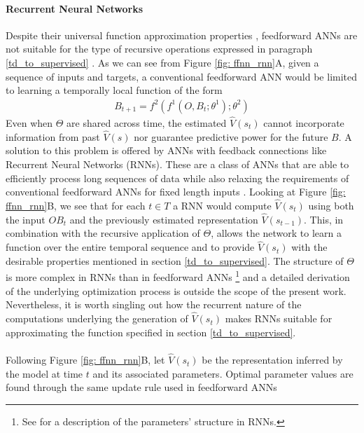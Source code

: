\paragraph*{\textbf{Recurrent Neural Networks}}
\label{rnn_theory}
Despite their universal function approximation properties \cite{hornik1989multilayer}, feedforward ANNs are not suitable for the type of recursive operations expressed in paragraph \ref{td_to_supervised} \cite{bengio2017deep}. As we can see from Figure \ref{fig: ffnn_rnn}A, given a sequence of inputs and targets, a conventional feedforward ANN would be limited to learning a temporally local function of the form
\begin{gather}
\label{td_ffnn}
    B_{t+1} = f^2(f^1(O, B_{t}; \theta^{1}); \theta^{2})
\end{gather}
Even when $\Theta$ are shared across time, the estimated $\widehat{V}(s_t)$ cannot incorporate information from past $\widehat{V}(s)$ nor guarantee predictive power for the future $B$. A solution to this problem is offered by ANNs with feedback connections like Recurrent Neural Networks (RNNs). These  are a class of ANNs that are able to efficiently process long sequences of data while also relaxing the requirements of conventional feedforward ANNs for fixed length inputs \cite{bengio2017deep}. Looking at Figure \ref{fig: ffnn_rnn}B, we see that for each $t \in T$ a RNN would compute $\widehat{V}(s_t)$ using both the input $OB_{t}$ and the previously estimated representation $\widehat{V}(s_{t-1})$. This, in combination with the recursive application of $\Theta$, allows the network to learn a function over the entire temporal sequence and to provide $\widehat{V}(s_t)$ with the desirable properties mentioned in section \ref{td_to_supervised}. The structure of $\Theta$ is more complex in RNNs than in feedforward ANNs \footnote{See \cite{bengio2017deep} for a description of the parameters' structure in RNNs.} and a detailed derivation of the underlying optimization process is outside the scope of the present work. Nevertheless, it is worth singling out how the recurrent nature of the computations underlying the generation of $\widehat{V}(s_t)$  makes RNNs suitable for approximating the function specified in section \ref{td_to_supervised}. \\
\\
Following Figure \ref{fig: ffnn_rnn}B, let $\widehat{V}(s_t)$ be the representation inferred by the model at time $t$ and its associated parameters. Optimal parameter values are found through the same update rule used in feedforward ANNs
